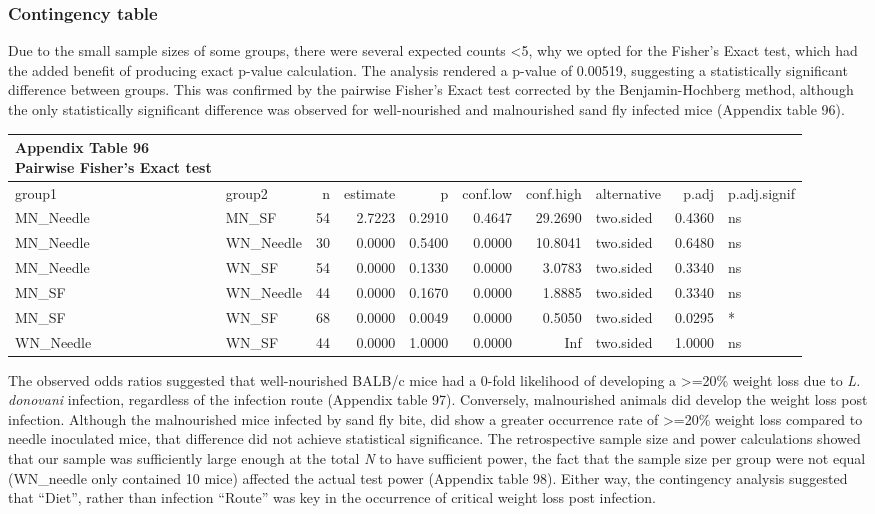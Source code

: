 \documentclass[
  12pt,
  letterpaper,
]{article}
\begin{document}
\subsubsection{Contingency table}\label{contingency-table-2}

Due to the small sample sizes of some groups, there were several expected counts \textless5, why we opted for the Fisher's Exact test, which had the added benefit of producing exact p-value calculation. The analysis rendered a p-value of 0.00519, suggesting a statistically significant difference between groups. This was confirmed by the pairwise Fisher's Exact test corrected by the Benjamin-Hochberg method, although the only statistically significant difference was observed for well-nourished and malnourished sand fly infected mice (Appendix table 96).

\begingroup
\fontsize{12.0pt}{14.4pt}\selectfont
\begin{longtable}{llrrrrrlrl}
\caption*{
{\large \textbf{Appendix Table 96}} \\ 
{\small \textbf{Pairwise Fisher's Exact test}}
} \\ 
\toprule
{group1} & {group2} & {n} & {estimate} & {p} & {conf.low} & {conf.high} & {alternative} & {p.adj} & {p.adj.signif} \\ 
\midrule\addlinespace[2.5pt]
MN\_Needle & MN\_SF & 54 & 2.7223 & 0.2910 & 0.4647 & 29.2690 & two.sided & 0.4360 & ns \\ 
MN\_Needle & WN\_Needle & 30 & 0.0000 & 0.5400 & 0.0000 & 10.8041 & two.sided & 0.6480 & ns \\ 
MN\_Needle & WN\_SF & 54 & 0.0000 & 0.1330 & 0.0000 & 3.0783 & two.sided & 0.3340 & ns \\ 
MN\_SF & WN\_Needle & 44 & 0.0000 & 0.1670 & 0.0000 & 1.8885 & two.sided & 0.3340 & ns \\ 
MN\_SF & WN\_SF & 68 & 0.0000 & 0.0049 & 0.0000 & 0.5050 & two.sided & 0.0295 & * \\ 
WN\_Needle & WN\_SF & 44 & 0.0000 & 1.0000 & 0.0000 & Inf & two.sided & 1.0000 & ns \\ 
\bottomrule
\end{longtable}
\endgroup

The observed odds ratios suggested that well-nourished BALB/c mice had a 0-fold likelihood of developing a \textgreater=20\% weight loss due to \emph{L. donovani} infection, regardless of the infection route (Appendix table 97). Conversely, malnourished animals did develop the weight loss post infection. Although the malnourished mice infected by sand fly bite, did show a greater occurrence rate of \textgreater=20\% weight loss compared to needle inoculated mice, that difference did not achieve statistical significance. The retrospective sample size and power calculations showed that our sample was sufficiently large enough at the total \emph{N} to have sufficient power, the fact that the sample size per group were not equal (WN\_needle only contained 10 mice) affected the actual test power (Appendix table 98). Either way, the contingency analysis suggested that ``Diet'', rather than infection ``Route'' was key in the occurrence of critical weight loss post infection.
\end{document}
